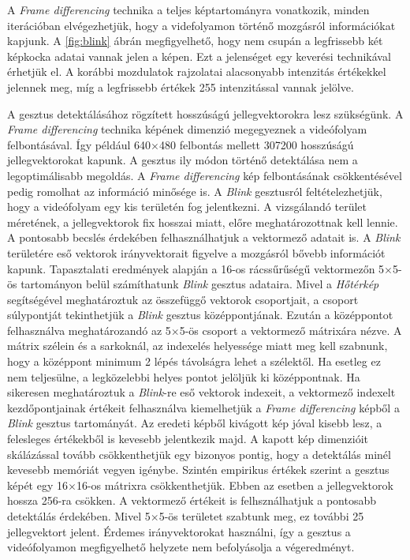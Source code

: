A \textit{Frame differencing} technika a teljes képtartományra vonatkozik, minden iterációban elvégezhetjük, hogy a videfolyamon történő mozgásról információkat kapjunk. A \ref{fig:blink} ábrán megfigyelhető, hogy nem csupán a legfrissebb két képkocka adatai vannak jelen a képen. Ezt a jelenséget egy keverési technikával érhetjük el. A korábbi mozdulatok rajzolatai alacsonyabb intenzitás értékekkel jelennek meg, míg a legfrissebb értékek 255 intenzitással vannak jelölve.

A gesztus detektálásához rögzített hosszúságú jellegvektorokra lesz szükségünk. A \textit{Frame differencing} technika képének dimenzió megegyeznek a videófolyam felbontásával. Így például 640$\times$480 felbontás mellett 307200 hosszúságú jellegvektorokat kapunk. A gesztus ily módon történő detektálása nem a legoptimálisabb megoldás. A \textit{Frame differencing} kép felbontásának csökkentésével pedig romolhat az információ minősége is.
A \textit{Blink} gesztusról feltételezhetjük, hogy a videófolyam egy kis területén fog jelentkezni. A vizsgálandó terület méretének, a jellegvektorok fix hosszai miatt, előre meghatározottnak kell lennie. A pontosabb becslés érdekében felhasználhatjuk a vektormező adatait is. A \textit{Blink} területére eső vektorok irányvektorait figyelve a mozgásról bővebb információt kapunk. Tapasztalati eredmények alapján a 16-os rácssűrűségű vektormezőn 5$\times$5-ös tartományon belül számíthatunk \textit{Blink} gesztus adataira. Mivel a \textit{Hőtérkép} segítségével meghatároztuk az összefüggő vektorok csoportjait, a csoport súlypontját tekinthetjük a \textit{Blink} gesztus középpontjának. Ezután a középpontot felhasználva meghatározandó az 5$\times$5-ös csoport a vektormező mátrixára nézve. A mátrix szélein és a sarkoknál, az indexelés helyessége miatt meg kell szabnunk, hogy a középpont minimum 2 lépés távolságra lehet a szélektől. Ha esetleg ez nem teljesülne, a legközelebbi helyes pontot jelöljük ki középpontnak. Ha sikeresen meghatároztuk a \textit{Blink}-re eső vektorok indexeit, a vektormező indexelt kezdőpontjainak értékeit felhasználva kiemelhetjük a \textit{Frame differencing} képből a \textit{Blink} gesztus tartományát. Az eredeti képből kivágott kép jóval kisebb lesz, a felesleges értékekből is kevesebb jelentkezik majd.
A kapott kép dimenzióit skálázással tovább csökkenthetjük egy bizonyos pontig, hogy a detektálás minél kevesebb memóriát vegyen igénybe. Szintén empirikus értékek szerint a gesztus képét egy 16$\times$16-os mátrixra csökkenthetjük. Ebben az esetben a jellegvektorok hossza 256-ra csökken. A vektormező értékeit is felhsználhatjuk a pontosabb detektálás érdekében. Mivel 5$\times$5-ös területet szabtunk meg, ez további 25 jellegvektort jelent. Érdemes irányvektorokat használni, így a gesztus a videófolyamon megfigyelhető helyzete nem befolyásolja a végeredményt.

